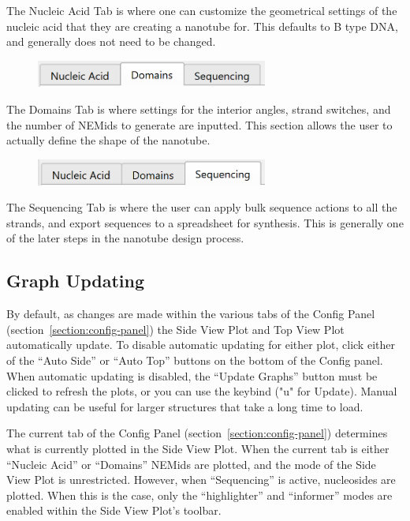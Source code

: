 \documentclass[
titlepage,
fontsize=12pt
]{article}
\newcommand{\sunken}[1]{\tcbox[on line, boxsep=.01in, left=0in, right=0in, top=0in, bottom=0in, colframe=sunken-color-outline, colback=sunken-color-background, arc=0.015in]{\texttt{#1}}}
\begin{document}
	The Nucleic Acid Tab is where one can customize the geometrical settings of the nucleic acid that they are creating a nanotube for. This defaults to B type DNA, and generally does not need to be changed. 
	
	\begin{figure}[h]
		\centering
		\includegraphics[width=3in]{"domains-tab-activated.png"}
		\label{fig:domains-tab-activated}
	\end{figure}
	
	The Domains Tab is where settings for the interior angles, strand switches, and the number of NEMids to generate are inputted. This section allows the user to actually define the shape of the nanotube.
	
	\begin{figure}[h]
		\centering
		\includegraphics[width=3in]{"sequencing-tab-activated.png"}
		\label{fig:sequencing-activated}
	\end{figure}
	
	The Sequencing Tab is where the user can apply bulk sequence actions to all the strands, and export sequences to a spreadsheet for synthesis. This is generally one of the later steps in the nanotube design process.
	
	\subsection{Graph Updating}
	
	By default, as changes are made within the various tabs of the Config Panel (section~\ref{section:config-panel}) the Side View Plot and Top View Plot automatically update. To disable automatic updating for either plot, click either of the “Auto Side” or “Auto Top” buttons on the bottom of the Config panel. When automatic updating is disabled, the “Update Graphs” button must be clicked to refresh the plots, or you can use the keybind \sunken{control+u} ("u" for Update). Manual updating can be useful for larger structures that take a long time to load.
	
	The current tab of the Config Panel (section~\ref{section:config-panel}) determines what is currently plotted in the Side View Plot. When the current tab is either “Nucleic Acid” or “Domains” NEMids are plotted, and the mode of the Side View Plot is unrestricted. However, when “Sequencing” is active, nucleosides are plotted. When this is the case, only the “highlighter” and “informer” modes are enabled within the Side View Plot’s toolbar.
	
\end{document}
